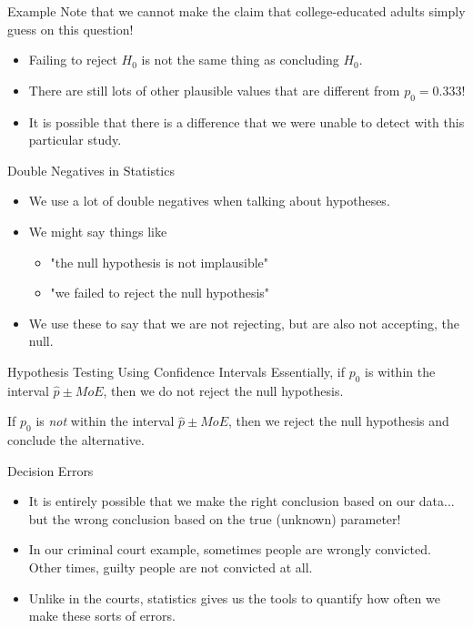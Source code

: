 \begin{frame}{Example}
    Note that we cannot make the claim that college-educated adults simply guess on this question!
    \begin{itemize}
        \item Failing to reject $H_0$ is not the same thing as concluding $H_0$.
        \item There are still lots of other plausible values that are different from $p_0=0.333$!
        \item It is possible that there is a difference that we were unable to detect with this particular study. 
    \end{itemize}
\end{frame}

\begin{frame}{Double Negatives in Statistics}
    \begin{itemize}
        \item We use a lot of double negatives when talking about hypotheses.
        \item We might say things like
        \begin{itemize}
            \item "the null hypothesis is not implausible"
            \item "we failed to reject the null hypothesis"
        \end{itemize}
        \item We use these to say that we are not rejecting, but are also not accepting, the null. 
    \end{itemize}
\end{frame}

\begin{frame}{Hypothesis Testing Using Confidence Intervals}
    Essentially, if $p_0$ is within the interval $\hat{p} \pm MoE$, then we do not reject the null hypothesis.
    
    \vspace{12pt}If $p_0$ is \textit{not} within the interval $\hat{p} \pm MoE$, then we reject the null hypothesis and conclude the alternative.
\end{frame}

\begin{frame}{Decision Errors}
    \begin{itemize}
        \item It is entirely possible that we make the right conclusion based on our data... but the wrong conclusion based on the true (unknown) parameter!
        \item In our criminal court example, sometimes people are wrongly convicted. Other times, guilty people are not convicted at all.
        \item Unlike in the courts, statistics gives us the tools to quantify how often we make these sorts of errors.
    \end{itemize}
\end{frame}

